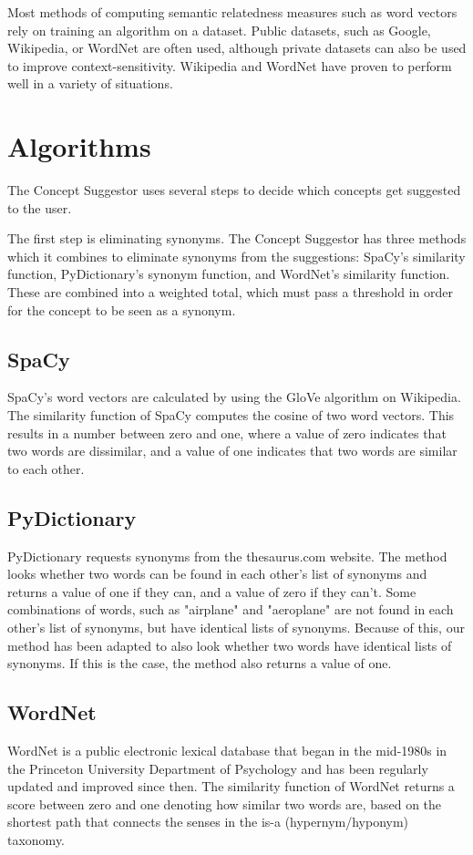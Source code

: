 \documentclass{article}
\begin{document}
Most methods of computing semantic relatedness measures such as word vectors rely on training an algorithm on a dataset. Public datasets, such as Google, Wikipedia, or WordNet are often used, although private datasets can also be used to improve context-sensitivity. Wikipedia and WordNet have proven to perform well in a variety of situations.\cite{strube2006wikirelate}

\section{Algorithms}

The Concept Suggestor uses several steps to decide which concepts get suggested to the user.

The first step is eliminating synonyms. The Concept Suggestor has three methods which it combines to eliminate synonyms from the suggestions: SpaCy's similarity function, PyDictionary's synonym function, and WordNet's similarity function. These are combined into a weighted total, which must pass a threshold in order for the concept to be seen as a synonym.

\subsection{SpaCy}
SpaCy's word vectors are calculated by using the GloVe algorithm on Wikipedia. The similarity function of SpaCy computes the cosine of two word vectors. This results in a number between zero and one, where a value of zero indicates that two words are dissimilar, and a value of one indicates that two words are similar to each other.

\subsection{PyDictionary}
PyDictionary requests synonyms from the thesaurus.com website. The method looks whether two words can be found in each other's list of synonyms and returns a value of one if they can, and a value of zero if they can't. Some combinations of words, such as "airplane" and "aeroplane" are not found in each other's list of synonyms, but have identical lists of synonyms. Because of this, our method has been adapted to also look whether two words have identical lists of synonyms. If this is the case, the method also returns a value of one.

\subsection{WordNet}
WordNet is a public electronic lexical database that began in the mid-1980s in the Princeton University Department of Psychology and has been regularly updated and improved since then. The similarity function of WordNet returns a score between zero and one denoting how similar two words are, based on the shortest path that connects the senses in the is-a (hypernym/hyponym) taxonomy. %
\end{document}
